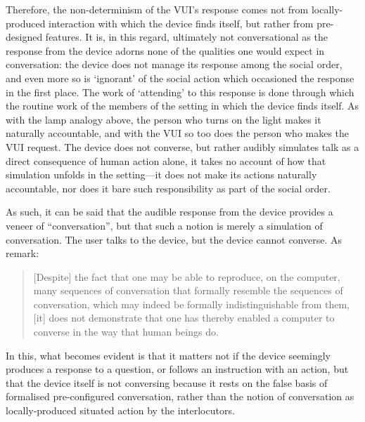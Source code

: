 \begin{corrections}
Therefore, the non-determinism of the \ac{VUI}'s response comes not from locally-produced interaction with which the device finds itself, but rather from pre-designed features.
It is, in this regard, ultimately not conversational as the response from the device adorns none of the qualities one would expect in conversation: the device does not manage its response among the social order, and even more so is `ignorant' of the social action which occasioned the response in the first place.
The work of `attending' to this response is done through which the routine work of the members of the setting in which the device finds itself.
As with the lamp analogy above, the person who turns on the light makes it naturally accountable, and with the \ac{VUI} so too does the person who makes the \ac{VUI} request.
The device does not converse, but rather audibly simulates talk as a direct consequence of human action alone, it takes no account of how that simulation unfolds in the setting---it does not make its actions naturally accountable, nor does it bare such responsibility as part of the social order.

As such, it can be said that the audible response from the device provides a veneer of ``conversation'', but that such a notion is merely a simulation of conversation.
The user talks to the device, but the device cannot converse. As \citet{Button1995} remark:
\begin{quote}
     [Despite] the fact that one may be able to reproduce, on the computer, many sequences of conversation that formally resemble the sequences of conversation, which may indeed be formally indistinguishable from them, [it] does not demonstrate that one has thereby enabled a computer to converse in the way that human beings do.
\end{quote}
In this, what becomes evident is that it matters not if the device seemingly produces a response to a question, or follows an instruction with an action, but that the device itself is not conversing because it rests on the false basis of formalised pre-configured conversation, rather than the notion of conversation as locally-produced situated action by the interlocutors.


\end{corrections}
